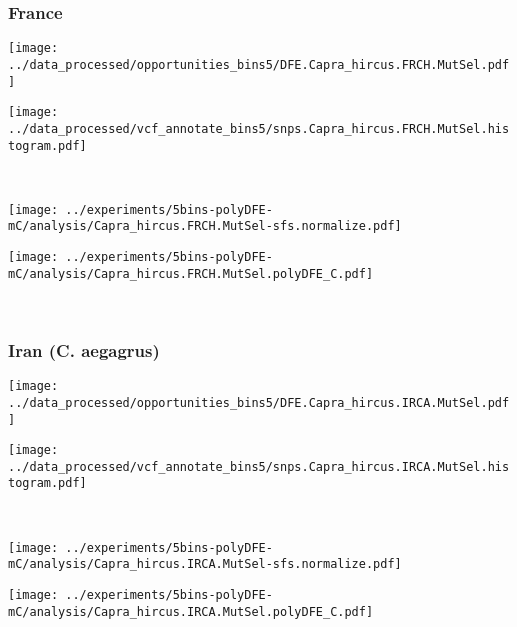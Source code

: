 \subsubsection{France}

\begin{minipage}{0.49\linewidth}
    \texttt{[image: ../data\_processed/opportunities\_bins5/DFE.Capra\_hircus.FRCH.MutSel.pdf]}
\end{minipage}
\begin{minipage}{0.49\linewidth}
    \texttt{[image: ../data\_processed/vcf\_annotate\_bins5/snps.Capra\_hircus.FRCH.MutSel.histogram.pdf]}
\end{minipage}
\\
\begin{minipage}{0.49\linewidth}
    \texttt{[image: ../experiments/5bins-polyDFE-mC/analysis/Capra\_hircus.FRCH.MutSel-sfs.normalize.pdf]}
\end{minipage}
\begin{minipage}{0.49\linewidth}
    \texttt{[image: ../experiments/5bins-polyDFE-mC/analysis/Capra\_hircus.FRCH.MutSel.polyDFE\_C.pdf]}
\end{minipage}
\\

\subsubsection{Iran (C. aegagrus)}

\begin{minipage}{0.49\linewidth}
    \texttt{[image: ../data\_processed/opportunities\_bins5/DFE.Capra\_hircus.IRCA.MutSel.pdf]}
\end{minipage}
\begin{minipage}{0.49\linewidth}
    \texttt{[image: ../data\_processed/vcf\_annotate\_bins5/snps.Capra\_hircus.IRCA.MutSel.histogram.pdf]}
\end{minipage}
\\
\begin{minipage}{0.49\linewidth}
    \texttt{[image: ../experiments/5bins-polyDFE-mC/analysis/Capra\_hircus.IRCA.MutSel-sfs.normalize.pdf]}
\end{minipage}
\begin{minipage}{0.49\linewidth}
    \texttt{[image: ../experiments/5bins-polyDFE-mC/analysis/Capra\_hircus.IRCA.MutSel.polyDFE\_C.pdf]}
\end{minipage}
\\

